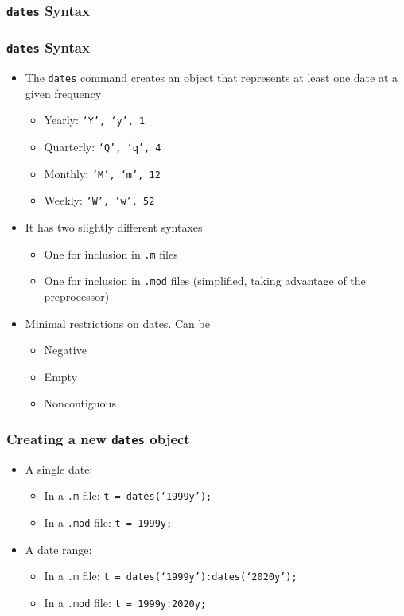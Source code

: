 \documentclass[10pt]{beamer}
\begin{document}
\subsubsection{\texttt{dates} Syntax}
\begin{frame}[fragile,t]
  \frametitle{\texttt{dates} Syntax}
  \begin{itemize}
  \item The \texttt{dates} command creates an object that represents at least one date at a given frequency
    \begin{itemize}
    \item Yearly: \texttt{`Y', `y', 1}
    \item Quarterly: \texttt{`Q', `q', 4}
    \item Monthly: \texttt{`M', `m', 12}
    \item Weekly: \texttt{`W', `w', 52}
    \end{itemize}
  \item It has two slightly different syntaxes
    \begin{itemize}
    \item One for inclusion in \texttt{.m} files
    \item One for inclusion in \texttt{.mod} files (simplified, taking advantage of the preprocessor)
    \end{itemize}
  \item Minimal restrictions on dates. Can be
    \begin{itemize}
      \item Negative
      \item Empty
      \item Noncontiguous
    \end{itemize}
  \end{itemize}
\end{frame}


\begin{frame}[fragile,t]
  \frametitle{Creating a new \texttt{dates} object}
  \begin{itemize}
  \item A single date:
    \begin{itemize}
    \item In a \texttt{.m} file: \texttt{t = dates(`1999y');}
    \item In a \texttt{.mod} file: \texttt{t = 1999y;}
    \end{itemize}
  \item A date range:
    \begin{itemize}
    \item In a \texttt{.m} file: \texttt{t = dates(`1999y'):dates(`2020y');}
    \item In a \texttt{.mod} file: \texttt{t = 1999y:2020y;}
    \end{itemize}
  \end{itemize}
\end{frame}
\end{document}
